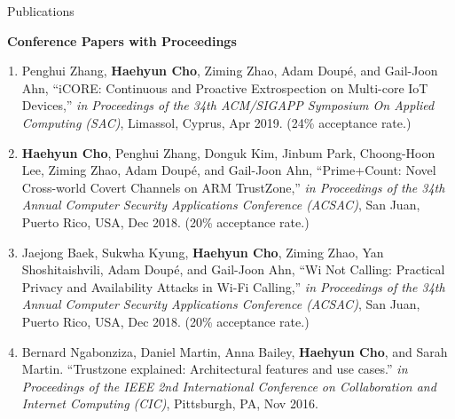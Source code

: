 \documentclass{resume} %
\makeatletter
\newlength{\bibhang}
\newlength{\bibsep}
{\@listi \global\bibsep\itemsep \global\advance\bibsep by\parsep}
\newenvironment{bibsection}%
{\begin{enumerate}{}{%
			\setlength{\leftmargin}{\bibhang}%
			\setlength{\itemindent}{-\leftmargin}%
			\setlength{\itemsep}{\bibsep}%
			\setlength{\parsep}{\z@}%
			\setlength{\partopsep}{0pt}%
			\setlength{\topsep}{0pt}}}
	{\end{enumerate}\vspace{-.6\baselineskip}}
\makeatother
\begin{document}

\begin{rSection}{\faGenderless~Publications}

	\strut\textbullet~{\bf Conference Papers with Proceedings}
	\begin{bibsection}
		\item Penghui Zhang, {\bf Haehyun Cho}, Ziming Zhao, Adam Doup\'e, and Gail-Joon Ahn,
		``iCORE: Continuous and Proactive Extrospection on Multi-core IoT Devices,'' 
        \emph{in Proceedings of the 34th ACM/SIGAPP Symposium On Applied Computing (SAC)}, 
		Limassol, Cyprus, Apr 2019. (24\% acceptance rate.)
     
        \item {\bf Haehyun Cho}, Penghui Zhang, Donguk Kim, Jinbum Park, Choong-Hoon Lee, Ziming Zhao, Adam Doup\'e, and Gail-Joon Ahn,
		``Prime+Count: Novel Cross-world Covert Channels on ARM TrustZone,'' 
        \emph{in Proceedings of the 34th Annual Computer Security Applications Conference (ACSAC)}, 
		San Juan, Puerto Rico, USA, Dec 2018. (20\% acceptance rate.)

		\item Jaejong Baek, Sukwha Kyung, {\bf Haehyun Cho}, Ziming Zhao, Yan Shoshitaishvili, Adam Doup\'e, and Gail-Joon Ahn,
		``Wi Not Calling: Practical Privacy and Availability Attacks in Wi-Fi Calling,'' 
		\emph{in Proceedings of the 34th Annual Computer Security Applications Conference (ACSAC)}, 
		San Juan, Puerto Rico, USA, Dec 2018. (20\% acceptance rate.)

		\item Bernard Ngabonziza, Daniel Martin, Anna Bailey, {\bf Haehyun Cho}, and Sarah Martin.
		``Trustzone explained: Architectural features and use cases.''
        \emph{in Proceedings of the IEEE 2nd International Conference on Collaboration and Internet Computing (CIC)}, 
        Pittsburgh, PA, Nov 2016. 

	\end{bibsection}


\end{rSection}
\end{document}
